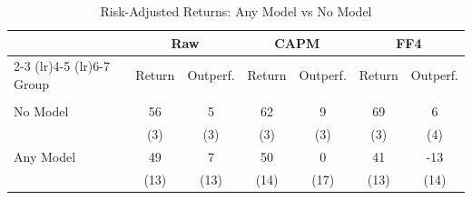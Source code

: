 \begin{table}[htbp]
\centering
\small
\caption{Risk-Adjusted Returns: Any Model vs No Model}
\label{tab:risk_adjusted_tv_anymodel}
\begin{tabular}{lcccccc}
\toprule
  & \multicolumn{2}{c}{Raw} & \multicolumn{2}{c}{CAPM} & \multicolumn{2}{c}{FF4}
\\
\cmidrule(lr){2-3} \cmidrule(lr){4-5} \cmidrule(lr){6-7}
Group & Return & Outperf. & Return & Outperf. & Return & Outperf.
\\
\midrule
\multicolumn{7}{l}{\textbf{}}\\
\addlinespace[2pt]
No Model & 56 & 5 & 62 & 9 & 69 & 6
\\
 & (3) & (3) & (3) & (3) & (3) & (4)
\\[2pt]
Any Model & 49 & 7 & 50 & 0 & 41 & -13
\\
 & (13) & (13) & (14) & (17) & (13) & (14)
\\[2pt]
\bottomrule
\end{tabular}
\end{table}
